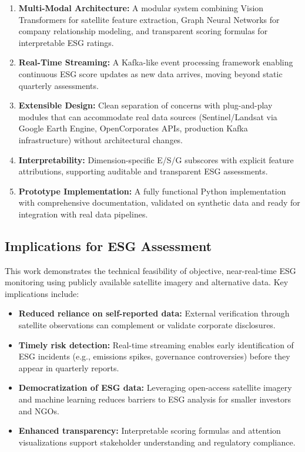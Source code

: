 \begin{enumerate}
\item \textbf{Multi-Modal Architecture:} A modular system combining Vision Transformers for satellite feature extraction, Graph Neural Networks for company relationship modeling, and transparent scoring formulas for interpretable ESG ratings.

\item \textbf{Real-Time Streaming:} A Kafka-like event processing framework enabling continuous ESG score updates as new data arrives, moving beyond static quarterly assessments.

\item \textbf{Extensible Design:} Clean separation of concerns with plug-and-play modules that can accommodate real data sources (Sentinel/Landsat via Google Earth Engine, OpenCorporates APIs, production Kafka infrastructure) without architectural changes.

\item \textbf{Interpretability:} Dimension-specific E/S/G subscores with explicit feature attributions, supporting auditable and transparent ESG assessments.

\item \textbf{Prototype Implementation:} A fully functional Python implementation with comprehensive documentation, validated on synthetic data and ready for integration with real data pipelines.
\end{enumerate}

\subsection{Implications for ESG Assessment}

This work demonstrates the technical feasibility of objective, near-real-time ESG monitoring using publicly available satellite imagery and alternative data. Key implications include:

\begin{itemize}
\item \textbf{Reduced reliance on self-reported data:} External verification through satellite observations can complement or validate corporate disclosures.
\item \textbf{Timely risk detection:} Real-time streaming enables early identification of ESG incidents (e.g., emissions spikes, governance controversies) before they appear in quarterly reports.
\item \textbf{Democratization of ESG data:} Leveraging open-access satellite imagery and machine learning reduces barriers to ESG analysis for smaller investors and NGOs.
\item \textbf{Enhanced transparency:} Interpretable scoring formulas and attention visualizations support stakeholder understanding and regulatory compliance.
\end{itemize}

